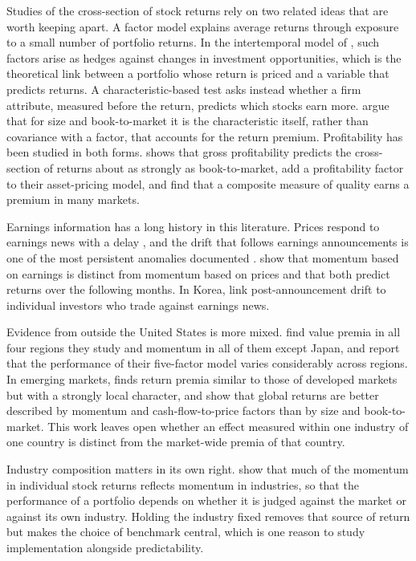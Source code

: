 \documentclass[12pt,a4paper]{article}
\begin{document}
Studies of the cross-section of stock returns rely on two related ideas that are worth keeping apart. A factor model
explains average returns through exposure to a small number of portfolio returns. In the intertemporal model of
\citet{merton1973}, such factors arise as hedges against changes in investment opportunities, which is the theoretical
link between a portfolio whose return is priced and a variable that predicts returns. A characteristic-based test asks
instead whether a firm attribute, measured before the return, predicts which stocks earn more. \citet{danieltitman1997}
argue that for size and book-to-market it is the characteristic itself, rather than covariance with a factor, that
accounts for the return premium. Profitability has been studied in both forms. \citet{novymarx2013} shows that gross
profitability predicts the cross-section of returns about as strongly as book-to-market, \citet{famafrench2015} add a
profitability factor to their asset-pricing model, and \citet{asness2019} find that a composite measure of quality
earns a premium in many markets.

Earnings information has a long history in this literature. Prices respond to earnings news with a delay
\citep{ballbrown1968}, and the drift that follows earnings announcements is one of the most persistent anomalies
documented \citep{bernardthomas1989}. \citet{chanjegadeeshlakonishok1996} show that momentum based on earnings is
distinct from momentum based on prices and that both predict returns over the following months. In Korea,
\citet{eom2019} link post-announcement drift to individual investors who trade against earnings news.

Evidence from outside the United States is more mixed. \citet{famafrench2012} find value premia in all four regions
they study and momentum in all of them except Japan, and \citet{famafrench2017} report that the performance of their
five-factor model varies considerably across regions. In emerging markets,
\citet{rouwenhorst1999} finds return premia similar to those of developed markets but with a strongly local character,
and \citet{houkarolyikho2011} show that global returns are better described by momentum and cash-flow-to-price factors
than by size and book-to-market. This work leaves open whether an effect measured within one industry of one country is
distinct from the market-wide premia of that country.

Industry composition matters in its own right. \citet{moskowitzgrinblatt1999} show that much of the momentum in
individual stock returns reflects momentum in industries, so that the performance of a portfolio depends on whether it
is judged against the market or against its own industry. Holding the industry fixed removes that source of return but
makes the choice of benchmark central, which is one reason to study implementation alongside predictability.
\end{document}
